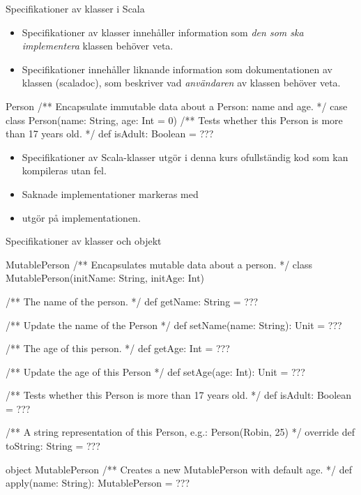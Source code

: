 



\begin{Slide}{Specifikationer av klasser i Scala}\footnotesize
\begin{itemize}
\item Specifikationer av klasser innehåller information som \emph{den som ska implementera} klassen behöver veta.
\item Specifikationer innehåller liknande information som dokumentationen av klassen (scaladoc), som beskriver vad \emph{användaren} av klassen behöver veta.  
\end{itemize}
\begin{ScalaSpec}{Person}
/** Encapsulate immutable data about a Person: name and age. */ 
case class Person(name: String, age: Int = 0){
  /** Tests whether this Person is more than 17 years old. */
  def isAdult: Boolean = ???
}
\end{ScalaSpec}
\begin{itemize}
\item Specifikationer av Scala-klasser utgör i denna kurs ofullständig kod som kan kompileras utan fel. 
\item Saknade implementationer markeras med 
\item {} utgör  på implementationen.
\end{itemize}

\end{Slide}


\begin{Slide}{Specifikationer av klasser och objekt}
\begin{ScalaSpec}{MutablePerson}
/** Encapsulates mutable data about a person. */
class MutablePerson(initName: String, initAge: Int){
  /** The name of the person. */
  def getName: String = ???
  
  /** Update the name of the Person */
  def setName(name: String): Unit = ???

  /** The age of this person. */
  def getAge: Int = ???

  /** Update the age of this Person */
  def setAge(age: Int): Unit = ???

  /** Tests whether this Person is more than 17 years old. */
  def isAdult: Boolean = ???

  /** A string representation of this Person, e.g.: Person(Robin, 25) */
  override def toString: String = ???
}
object MutablePerson {
  /** Creates a new MutablePerson with default age. */
  def apply(name: String): MutablePerson = ???
}
\end{ScalaSpec}

\end{Slide}


